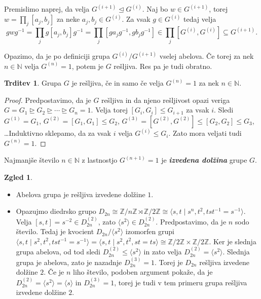 \documentclass[11pt]{book}
\def\NN{\mathbb{N}}
\def\ZZ{\mathbb{Z}}
\def\definicija{\color{rdeca}\bf\em}
\theoremstyle{definition}
\theoremstyle{zgled}
\newtheorem*{zgled}{Zgled}
\theoremstyle{odprtproblem}
\theoremstyle{domacanaloga}
\newenvironment{dokaz}
    {\color{siva}\begin{proof}}
    {\end{proof}}
\theoremstyle{izrek}
\newtheorem*{trditev}{Trditev}
\begin{document}
Premislimo naprej, da velja $G^{(i+1)} \unlhd G^{(i)}$. Naj bo $w \in G^{(i+1)}$, torej $w = \prod_{j} [a_j, b_j]$ za neke $a_j, b_j \in G^{(i)}$. Za vsak $g \in G^{(i)}$ tedaj velja
\[
g w g^{-1} = \prod_j g [a_j, b_j] g^{-1} = \prod_j [g a_j g^{-1}, g b_j g^{-1}] \in \prod_j [G^{(i)}, G^{(i)}] \subseteq G^{(i+1)}.
\]

Opazimo, da je po definiciji grupa $G^{(i)}/G^{(i+1)}$ vselej abelova. Če torej za nek $n \in \NN$ velja $G^{(n)} = 1$, potem je $G$ rešljiva. Res pa je tudi obratno.

\begin{trditev}
Grupa $G$ je rešljiva, če in samo če velja $G^{(n)} = 1$ za nek $n \in \NN$.
\end{trditev}

\begin{dokaz}
Predpostavimo, da je $G$ rešljiva in da njeno rešljivost opazi veriga $G = G_1 \unrhd G_2 \unrhd \cdots \unrhd G_n = 1$. Velja torej $[G_i, G_i] \leq G_{i+1}$ za vsak $i$. Sledi $G^{(1)} = G_1$, $G^{(2)} = [G_1, G_1] \leq G_2$, $G^{(3)} = [G^{(2)}, G^{(2)}] \leq [G_2, G_2] \leq G_3$, \dots Induktivno sklepamo, da za vsak $i$ velja $G^{(i)} \leq G_i$. Zato mora veljati tudi $G^{(n)} = 1$.
\end{dokaz}

Najmanjše število $n \in \NN$ z lastnostjo $G^{(n+1)} = 1$ je {\definicija izvedena dolžina} grupe $G$.

\begin{zgled}
\begin{itemize}
    \item Abelova grupa je rešljiva izvedene dolžine $1$.
    \item Opazujmo diedrsko grupo $D_{2n} \cong \ZZ/n\ZZ \rtimes \ZZ/2\ZZ \cong \langle s, t \mid s^n, t^2, t s t^{-1} = s^{-1} \rangle$. Velja $[s,t] = s^{-2} \in D_{2n}^{(2)}$, zato $\langle s^2 \rangle \in D_{2n}^{(2)}$. Predpostavimo, da je $n$ sodo število. Tedaj je kvocient $D_{2n}/\langle s^2 \rangle$ izomorfen grupi $\langle s, t \mid s^2, t^2, t s t^{-1} = s^{-1} \rangle = \langle s, t \mid s^2, t^2, st=ts \rangle \cong \ZZ/2\ZZ \times \ZZ/2\ZZ$. Ker je slednja grupa abelova, od tod sledi $D_{2n}^{(2)} \leq \langle s^2 \rangle$ in zato velja $D_{2n}^{(2)} = \langle s^2 \rangle$. Slednja grupa je abelova, zato je nazadnje $D_{2n}^{(3)} = 1$. Torej je $D_{2n}$ rešljiva izvedene dolžine $2$. Če je $n$ liho število, podoben argument pokaže, da je $D_{2n}^{(2)} = \langle s^2 \rangle = \langle s \rangle$ in $D_{2n}^{(3)} = 1$, torej je tudi v tem primeru grupa rešljiva izvedene dolžine $2$.
\end{itemize}
\end{zgled}
\end{document}
